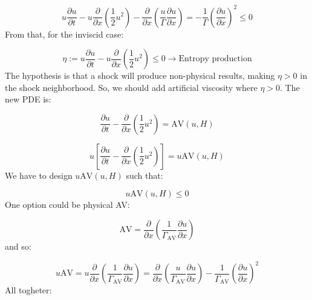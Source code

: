 \documentclass[10pt,a4paper]{article}
\begin{document}
\begin{equation}
    u\dfrac{\partial u }{\partial t}
    -
    u\dfrac{\partial}{\partial x}\left(\dfrac{1}{2}u^2\right)
    -
    \dfrac{\partial }{\partial x}\left(\dfrac{u}{\Gamma} \dfrac{\partial u}{\partial x}\right)
    =
    - \dfrac{1}{\Gamma}\left(\dfrac{\partial u}{\partial x}\right)^2 
    \leq 0
\end{equation}
From that, for the inviscid case:

\begin{equation}
    \eta
    :=
    u\dfrac{\partial u }{\partial t}
    -
    u\dfrac{\partial}{\partial x}\left(\dfrac{1}{2}u^2\right)
    \leq
    0
    \rightarrow \text{Entropy production}
\end{equation}
The hypothesis is that a shock will produce non-physical results, making $\eta > 0$ in the shock neighborhood.
So, we should add artificial viscosity where $\eta > 0$. The new PDE is:

\begin{equation}
    \dfrac{\partial u}{\partial t}
    -
    \dfrac{\partial}{\partial x}\left(\dfrac{1}{2}u^2\right)
    =
    \text{AV}(u,H)
\end{equation}

\begin{equation}
    u
    \left[
    \dfrac{\partial u}{\partial t}
    -
    \dfrac{\partial}{\partial x}\left(\dfrac{1}{2}u^2\right)
    \right]
    =
    u\text{AV}(u,H)
\end{equation}
We have to design $u\text{AV}(u,H)$ such that:

\begin{equation}
    u\text{AV}(u,H) \leq 0
\end{equation}
One option could be physical AV:

\begin{equation}
    \text{AV} = \dfrac{\partial }{\partial x}\left(\dfrac{1}{\Gamma_\text{AV}} \dfrac{\partial u}{\partial x}\right)
\end{equation}
and so:

\begin{equation}
    u\text{AV} 
    =
    u \dfrac{\partial }{\partial x}\left(\dfrac{1}{\Gamma_\text{AV}} \dfrac{\partial u}{\partial x}\right)
    =
    \dfrac{\partial}{\partial x}\left(\dfrac{u}{\Gamma_\text{AV}} \dfrac{\partial u}{\partial x}\right) - \dfrac{1}{\Gamma_\text{AV}}\left(\dfrac{\partial u}{\partial x}\right)^2
\end{equation}
All togheter:
\end{document}
